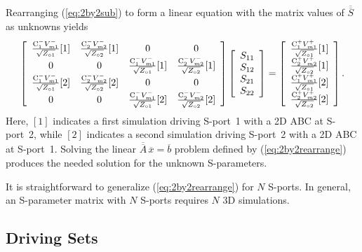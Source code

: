 \documentclass[titlepage]{article}
\renewcommand\_{\textunderscore\linebreak[1]}
\begin{document}
Rearranging (\ref{eq:2by2sub}) to form a linear equation with the matrix values of $\overline{\overline{S}}$ as unknowns yields
\begin{equation}
\label{eq:2by2rearrange}
\left[ \begin{array}{cccc}
  \frac{\textnormal{C}_{1}^{-}V_{m1}^{-}}{\sqrt{Z_{\circ 1}}}[1] & \frac{\textnormal{C}_{2}^{-}V_{m2}^{-}}{\sqrt{Z_{\circ 2}}}[1] & 0 & 0\\
  0 & 0 & \frac{\textnormal{C}_{1}^{-}V_{m1}^{-}}{\sqrt{Z_{\circ 1}}}[1] & \frac{\textnormal{C}_{2}^{-}V_{m2}^{-}}{\sqrt{Z_{\circ 2}}}[1]\\
  \frac{\textnormal{C}_{1}^{-}V_{m1}^{-}}{\sqrt{Z_{\circ 1}}}[2] & \frac{\textnormal{C}_{2}^{-}V_{m2}^{-}}{\sqrt{Z_{\circ 2}}}[2] & 0 & 0\\
  0 & 0 & \frac{\textnormal{C}_{1}^{-}V_{m1}^{-}}{\sqrt{Z_{\circ 1}}}[2] & \frac{\textnormal{C}_{2}^{-}V_{m2}^{-}}{\sqrt{Z_{\circ 2}}}[2]\\
\end{array} \right]
\left[ \begin{array}{c}
  S_{11} \\
  S_{12} \\
  S_{21} \\
  S_{22} \\
\end{array} \right] =
\left[ \begin{array}{c}
  \frac{\textnormal{C}_{1}^{+}V_{m1}^{+}}{\sqrt{Z_{\circ 1}}}[1] \\
  \frac{\textnormal{C}_{2}^{+}V_{m2}^{+}}{\sqrt{Z_{\circ 2}}}[1] \\
  \frac{\textnormal{C}_{1}^{+}V_{m1}^{+}}{\sqrt{Z_{\circ 1}}}[2] \\
  \frac{\textnormal{C}_{2}^{+}V_{m2}^{+}}{\sqrt{Z_{\circ 2}}}[2] \\
\end{array} \right].
\end{equation}
Here, $[1]$ indicates a first simulation driving S-port~1 with a 2D ABC at S-port~2, while $[2]$ indicates a second simulation driving S-port~2 with a 2D ABC at S-port~1.  Solving the linear $\overline{\overline{A}}\,\overline{x}=\overline{b}$ problem defined by (\ref{eq:2by2rearrange}) produces the needed solution for the unknown S-parameters.

It is straightforward to generalize (\ref{eq:2by2rearrange}) for $N$ S-ports. In general, an S-parameter matrix with $N$ S-ports requires $N$ 3D simulations.

\subsection{Driving Sets}
\end{document}

